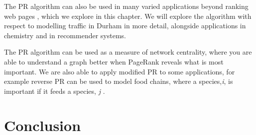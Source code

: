 \documentclass[11pt]{report}
\begin{document}
The PR algorithm can also be used in many varied applications beyond ranking web pages \cite{gleich2015pagerank}, which we explore in this chapter. We will explore the algorithm with respect to modelling traffic in Durham in more detail, alongside applications in chemistry and in recommender systems. 

The PR algorithm can be used as a measure of network centrality, where you are able to understand a graph better when PageRank reveals what is most important. We are also able to apply modified PR to some applications, for example reverse PR can be used to model food chains, where a species,\textit{i}, is important if it feeds a species, \textit{j} \cite{allesina2009googling}. 






\chapter{Conclusion} \label{chap:Conclusion}

\newpage
{}




\begin{appendices}




\end{appendices}
\end{document}
